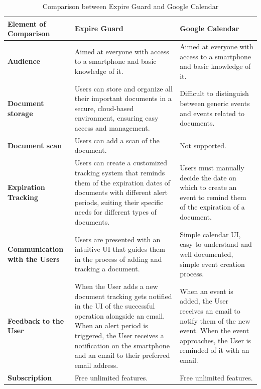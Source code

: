 \begin{table}[H]
	
	\begin{tabularx}{\textwidth}{|X|X|X|}
		\hline
		\textbf{Element of Comparison} & \textbf{Expire Guard} & \textbf{Google Calendar} \\ 
		\hline
		\textbf{Audience} & Aimed at everyone with access to a smartphone and basic knowledge of it. & Aimed at everyone with access to a smartphone and basic knowledge of it. \\
		\hline
		\textbf{Document storage} & Users can store and organize all their important documents in a secure, cloud-based environment, ensuring easy access and management. & Difficult to distinguish between generic events and events related to documents. \\
		\hline
		\textbf{Document scan} & Users can add a scan of the document. & Not supported. \\
		\hline
		\textbf{Expiration Tracking} & Users can create a customized tracking system that reminds them of the expiration dates of documents with different alert periods, suiting their specific needs for different types of documents. & Users must manually decide the date on which to create an event to remind them of the expiration of a document. \\
		\hline
		\textbf{Communication with the Users} & Users are presented with an intuitive UI that guides them in the process of adding and tracking a document. & Simple calendar UI, easy to understand and well documented, simple event creation process. \\
		\hline
		\textbf{Feedback to the User} & When the User adds a new document tracking gets notified in the UI of the successful operation alongside an email. When an alert period is triggered, the User receives a notification on the smartphone and an email to their preferred email address. & When an event is added, the User receives an email to notify them of the new event. When the event approaches, the User is reminded of it with an email. \\
		\hline
		\textbf{Subscription} & Free unlimited features. & Free unlimited features. \\
		\hline
	\end{tabularx}
	\caption{Comparison between Expire Guard and Google Calendar}
\end{table}
